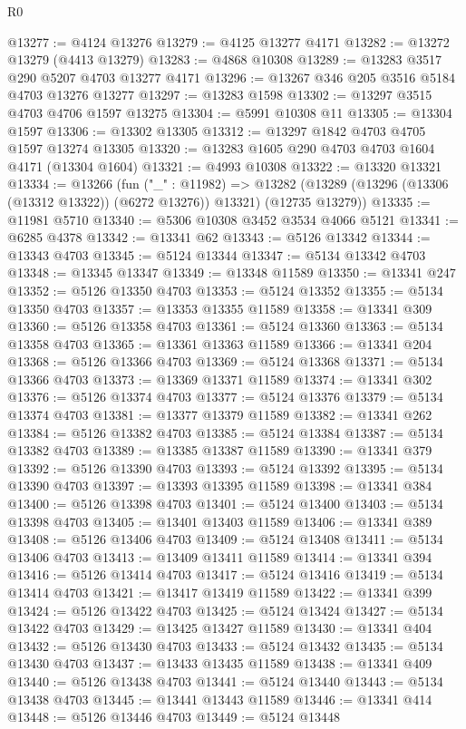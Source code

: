 \begin{lexlean}{R0}
\begin{coremodule}
@13277 := @4124 @13276
@13279 := @4125 @13277 @4171
@13282 := @13272 @13279 (@4413 @13279)
@13283 := @4868 @10308
@13289 := @13283 @3517 @290 @5207 @4703 @13277 @4171
@13296 := @13267 @346 @205 @3516 @5184 @4703 @13276 @13277
@13297 := @13283 @1598
@13302 := @13297 @3515 @4703 @4706 @1597 @13275
@13304 := @5991 @10308 @11
@13305 := @13304 @1597
@13306 := @13302 @13305
@13312 := @13297 @1842 @4703 @4705 @1597 @13274 @13305
@13320 := @13283 @1605 @290 @4703 @4703 @1604 @4171 (@13304 @1604)
@13321 := @4993 @10308
@13322 := @13320 @13321
@13334 := @13266
    (fun ("_" : @11982) =>
    @13282 (@13289 (@13296 (@13306 (@13312 @13322)) (@6272 @13276)) @13321) (@12735 @13279))
@13335 := @11981 @5710
@13340 := @5306 @10308 @3452 @3534 @4066 @5121
@13341 := @6285 @4378
@13342 := @13341 @62
@13343 := @5126 @13342
@13344 := @13343 @4703
@13345 := @5124 @13344
@13347 := @5134 @13342 @4703
@13348 := @13345 @13347
@13349 := @13348 @11589
@13350 := @13341 @247
@13352 := @5126 @13350 @4703
@13353 := @5124 @13352
@13355 := @5134 @13350 @4703
@13357 := @13353 @13355 @11589
@13358 := @13341 @309
@13360 := @5126 @13358 @4703
@13361 := @5124 @13360
@13363 := @5134 @13358 @4703
@13365 := @13361 @13363 @11589
@13366 := @13341 @204
@13368 := @5126 @13366 @4703
@13369 := @5124 @13368
@13371 := @5134 @13366 @4703
@13373 := @13369 @13371 @11589
@13374 := @13341 @302
@13376 := @5126 @13374 @4703
@13377 := @5124 @13376
@13379 := @5134 @13374 @4703
@13381 := @13377 @13379 @11589
@13382 := @13341 @262
@13384 := @5126 @13382 @4703
@13385 := @5124 @13384
@13387 := @5134 @13382 @4703
@13389 := @13385 @13387 @11589
@13390 := @13341 @379
@13392 := @5126 @13390 @4703
@13393 := @5124 @13392
@13395 := @5134 @13390 @4703
@13397 := @13393 @13395 @11589
@13398 := @13341 @384
@13400 := @5126 @13398 @4703
@13401 := @5124 @13400
@13403 := @5134 @13398 @4703
@13405 := @13401 @13403 @11589
@13406 := @13341 @389
@13408 := @5126 @13406 @4703
@13409 := @5124 @13408
@13411 := @5134 @13406 @4703
@13413 := @13409 @13411 @11589
@13414 := @13341 @394
@13416 := @5126 @13414 @4703
@13417 := @5124 @13416
@13419 := @5134 @13414 @4703
@13421 := @13417 @13419 @11589
@13422 := @13341 @399
@13424 := @5126 @13422 @4703
@13425 := @5124 @13424
@13427 := @5134 @13422 @4703
@13429 := @13425 @13427 @11589
@13430 := @13341 @404
@13432 := @5126 @13430 @4703
@13433 := @5124 @13432
@13435 := @5134 @13430 @4703
@13437 := @13433 @13435 @11589
@13438 := @13341 @409
@13440 := @5126 @13438 @4703
@13441 := @5124 @13440
@13443 := @5134 @13438 @4703
@13445 := @13441 @13443 @11589
@13446 := @13341 @414
@13448 := @5126 @13446 @4703
@13449 := @5124 @13448

\end{coremodule}
\end{lexlean}
